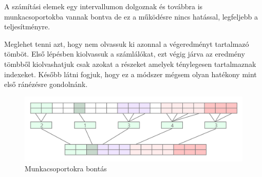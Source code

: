 A számítási elemek egy intervallumon dolgoznak és továbbra is munkacsoportokba vannak bontva de ez a működésre nincs hatással, legfeljebb a teljesítményre.

Meglehet tenni azt, hogy nem olvassuk ki azonnal a végeredményt tartalmazó tömböt.
Első lépésben kiolvassuk a számlálókat, ezt végig járva az eredmény tömbből kiolvashatjuk csak azokat a részeket amelyek ténylegesen
tartalmaznak indexeket. 
Később látni fogjuk, hogy ez a módszer mégsem olyan hatékony mint első ránézésre gondolnánk.


\begin{figure}[h!]
\centering
\includegraphics[width=\textwidth]{images/kimasol.png}
\caption{Munkacsoportokra bontás}
\label{fig:opencl}
\end{figure}




